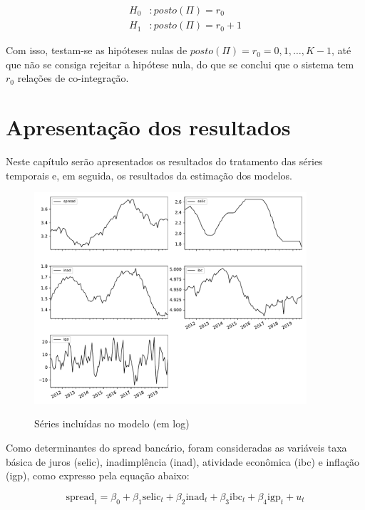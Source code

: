 \documentclass[a4paper,
               article,
               12pt,
               openany,
               oneside,
               english,
               brazil]{abntex2}
\numberwithin{equation}{section}
\begin{document}
   \begin{equation}
       \label{maxeig}
       \begin{aligned}
           H_0&: posto(\Pi) = r_0 \\
           H_1&: posto(\Pi) = r_0 + 1
       \end{aligned}
   \end{equation}

   Com isso, testam-se as hipóteses nulas de $ posto(\Pi) = r_0 = 0, 1, \dots, K-1 $, até que não se consiga rejeitar a hipótese nula, do que se conclui que o sistema tem $ r_0 $ relações de co-integração.

   \section{Apresentação dos resultados}

   Neste capítulo serão apresentados os resultados do tratamento das séries temporais e, em seguida, os resultados da estimação dos modelos.

    \begin{figure}[h]
        \centering
        \caption{Séries incluídas no modelo (em log)}
        \includegraphics[width = 0.9\textwidth, scale=1]{series_modelo.pdf}
        \label{graficos}
    \end{figure}

   Como determinantes do spread bancário, foram consideradas as variáveis taxa básica de juros (selic), inadimplência (inad), atividade econômica (ibc) e inflação (igp), como expresso pela equação abaixo:

   \begin{equation}
       \label{equacao_modelo}
       \text{spread}_t = \beta_0 + \beta_1 \text{selic}_t + \beta_2 \text{inad}_t + \beta_3 \text{ibc}_t + \beta_4 \text{igp}_t + u_t
   \end{equation}
\end{document}
